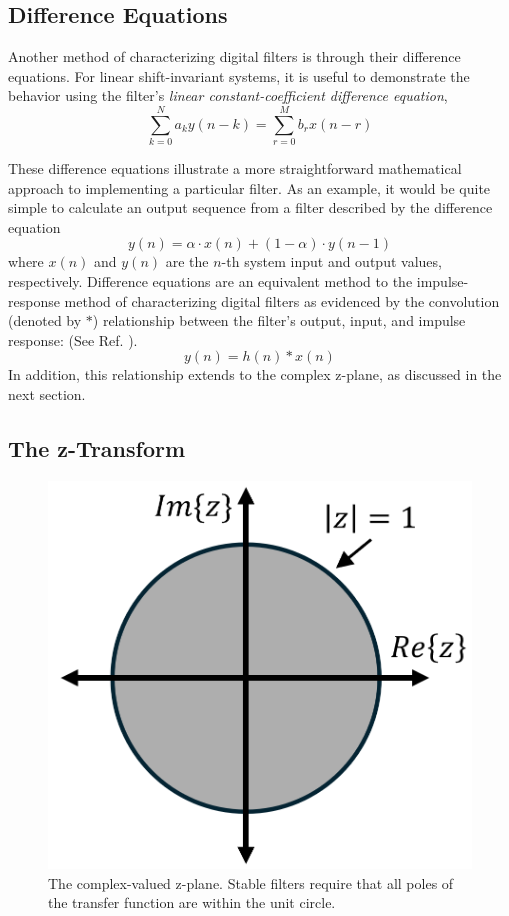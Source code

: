 \documentclass[reprint,amsmath,amssymb]{revtex4-2}
\begin{document}
\subsection{Difference Equations}

Another method of characterizing digital filters is through their difference equations. For linear shift-invariant systems, it is useful to demonstrate the behavior using the filter's \textit{linear constant-coefficient difference equation},
\begin{equation}
    \sum_{k=0}^Na_ky(n-k) = \sum_{r=0}^Mb_rx(n-r)
\end{equation}

These difference equations illustrate a more straightforward mathematical approach to implementing a particular filter. As an example, it would be quite simple to calculate an output sequence from a filter described by the difference equation
$$
y(n) = \alpha \cdot x(n) + (1-\alpha)\cdot y(n-1)
$$
where $x(n)$ and $y(n)$ are the $n$-th system input and output values, respectively. Difference equations are an equivalent method to the impulse-response method of characterizing digital filters as evidenced by the convolution (denoted by $*$) relationship between the filter's output, input, and impulse response: (See Ref. \cite{DSP}).
\begin{equation}
    y(n) = h(n) * x(n)
\end{equation}
In addition, this relationship extends to the complex z-plane, as discussed in the next section.

\subsection{The z-Transform}

\begin{figure}
    \centering
    \includegraphics[width=0.6\linewidth]{figs/zplane.png}
    \caption{The complex-valued z-plane. Stable filters require that all poles of the transfer function are within the unit circle.}
    \label{fig:3}
\end{figure}
\end{document}

